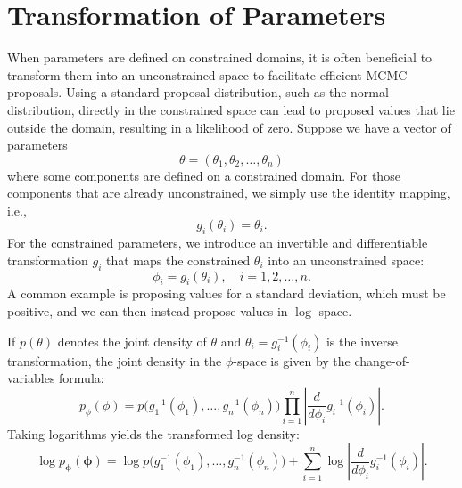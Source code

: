 \section*{Transformation of Parameters}
When parameters are defined on constrained domains, it is often beneficial to transform them into an unconstrained space to facilitate efficient MCMC proposals. Using a standard proposal distribution, such as the normal distribution, directly in the constrained space can lead to proposed values that lie outside the domain, resulting in a likelihood of zero. Suppose we have a vector of parameters 
\[
	\theta = (\theta_1, \theta_2, \dots, \theta_n)
\]
where some components are defined on a constrained domain. For those components that are already unconstrained, we simply use the identity mapping, i.e., 
\[
	g_i(\theta_i)=\theta_i.
\]
For the constrained parameters, we introduce an invertible and differentiable transformation \(g_i\) that maps the constrained \(\theta_i\) into an unconstrained space:
\[
	\phi_i = g_i(\theta_i), \quad i = 1,2,\dots,n.
\]
A common example is proposing values for a standard deviation, which must be positive, and we can then instead propose values in $\log$-space.

If \(p(\theta)\) denotes the joint density of \(\theta\) and \(\theta_i = g_i^{-1}(\phi_i)\) is the inverse transformation, the joint density in the \(\phi\)-space is given by the change-of-variables formula:
\[
	p_{\phi}(\phi) = p\bigl(g_1^{-1}(\phi_1), \dots, g_n^{-1}(\phi_n)\bigr) \prod_{i=1}^n \left|\frac{d}{d\phi_i} g_i^{-1}(\phi_i)\right|.
\]
Taking logarithms yields the transformed log density:
\[
	\log p_{\boldsymbol{\phi}}(\boldsymbol{\phi}) = \log p\bigl(g_1^{-1}(\phi_1), \dots, g_n^{-1}(\phi_n)\bigr) + \sum_{i=1}^n \log\left|\frac{d}{d\phi_i} g_i^{-1}(\phi_i)\right|.
\]


